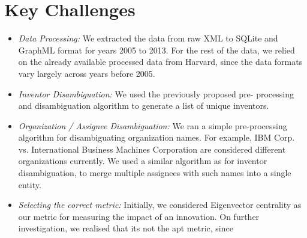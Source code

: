 \section{Key Challenges}
	\begin{itemize}
	\squish
		\item {\em Data Processing:} We extracted the data from raw XML to SQLite and
		GraphML format for years 2005 to 2013. For the rest of the data, we relied on
		the already available processed data from Harvard, since the data formats vary largely across years before 2005.
		\item {\em Inventor Disambiguation:} We used the previously proposed pre-
		processing and disambiguation algorithm to generate a list of unique
		inventors.
		\item {\em Organization / Assignee Disambiguation:} We ran a simple pre-processing algorithm for disambiguating
		organization names. For example, IBM Corp. vs. International Business Machines
		Corporation are considered different organizations currently. We used a
		similar algorithm as for inventor disambiguation, to merge multiple assignees
		with such names into a single entity.
		\item{\em Selecting the correct metric:} Initially, we considered Eigenvector centrality as our metric for measuring the  impact of an innovation. On further investigation, we realised that its not the apt metric, since 
	\end{itemize}
